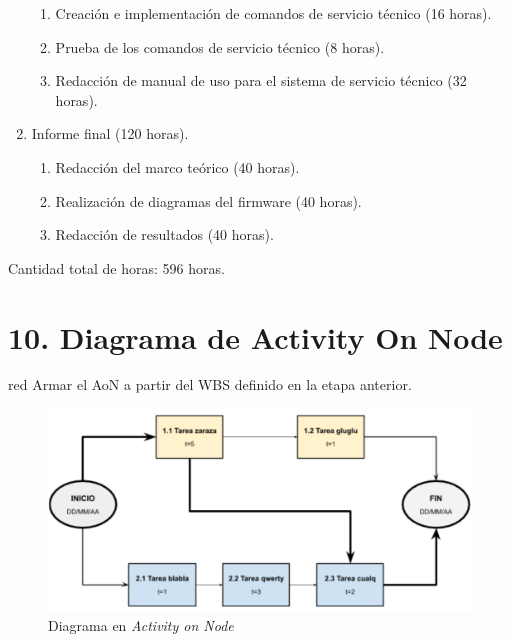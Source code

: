 \documentclass[
11pt, %
codirector, %
]{charter}
\begin{document}
\begin{enumerate}
\begin{enumerate}
		      \item Creación e implementación de comandos de servicio técnico (16 horas).
		      \item Prueba de los comandos de servicio técnico (8 horas).
		      \item Redacción de manual de uso para el sistema de servicio técnico (32 horas).
	      \end{enumerate}
	\item Informe final (120 horas).
	      \begin{enumerate}
		      \item Redacción del marco teórico (40 horas).
		      \item Realización de diagramas del firmware (40 horas).
		      \item Redacción de resultados (40 horas).
	      \end{enumerate}
\end{enumerate}


Cantidad total de horas: 596 horas.




\section{10. Diagrama de Activity On Node}
\label{sec:AoN}

\begin{consigna}{red}
	Armar el AoN a partir del WBS definido en la etapa anterior.



\end{consigna}

\begin{figure}[htpb]
	\centering
	\includegraphics[width=.8\textwidth]{./Figuras/AoN.png}
	\caption{Diagrama en \textit{Activity on Node}}
	\label{fig:AoN}
\end{figure}
\end{document}
